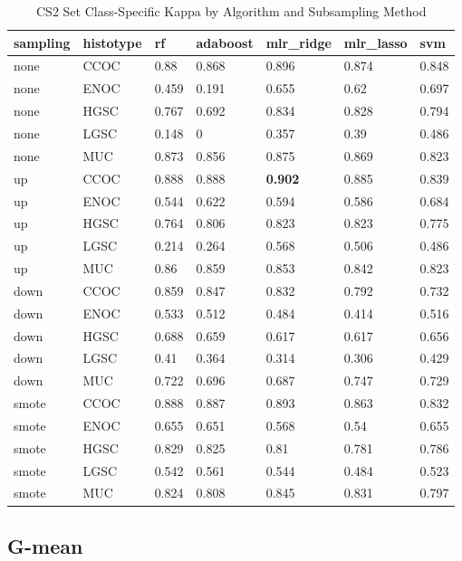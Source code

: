 \documentclass[
]{report}
\begin{document}
\begin{table}

\caption{\label{tab:cs2-kappa-class-table}CS2 Set Class-Specific Kappa by Algorithm and Subsampling Method}
\centering
\begin{tabular}[t]{l|l|l|l|l|l|l}
\hline
sampling & histotype & rf & adaboost & mlr\_ridge & mlr\_lasso & svm\\
\hline
none & CCOC & 0.88 & 0.868 & 0.896 & 0.874 & 0.848\\
\hline
none & ENOC & 0.459 & 0.191 & 0.655 & 0.62 & 0.697\\
\hline
none & HGSC & 0.767 & 0.692 & 0.834 & 0.828 & 0.794\\
\hline
none & LGSC & 0.148 & 0 & 0.357 & 0.39 & 0.486\\
\hline
none & MUC & 0.873 & 0.856 & 0.875 & 0.869 & 0.823\\
\hline
up & CCOC & 0.888 & 0.888 & \textbf{0.902} & 0.885 & 0.839\\
\hline
up & ENOC & 0.544 & 0.622 & 0.594 & 0.586 & 0.684\\
\hline
up & HGSC & 0.764 & 0.806 & 0.823 & 0.823 & 0.775\\
\hline
up & LGSC & 0.214 & 0.264 & 0.568 & 0.506 & 0.486\\
\hline
up & MUC & 0.86 & 0.859 & 0.853 & 0.842 & 0.823\\
\hline
down & CCOC & 0.859 & 0.847 & 0.832 & 0.792 & 0.732\\
\hline
down & ENOC & 0.533 & 0.512 & 0.484 & 0.414 & 0.516\\
\hline
down & HGSC & 0.688 & 0.659 & 0.617 & 0.617 & 0.656\\
\hline
down & LGSC & 0.41 & 0.364 & 0.314 & 0.306 & 0.429\\
\hline
down & MUC & 0.722 & 0.696 & 0.687 & 0.747 & 0.729\\
\hline
smote & CCOC & 0.888 & 0.887 & 0.893 & 0.863 & 0.832\\
\hline
smote & ENOC & 0.655 & 0.651 & 0.568 & 0.54 & 0.655\\
\hline
smote & HGSC & 0.829 & 0.825 & 0.81 & 0.781 & 0.786\\
\hline
smote & LGSC & 0.542 & 0.561 & 0.544 & 0.484 & 0.523\\
\hline
smote & MUC & 0.824 & 0.808 & 0.845 & 0.831 & 0.797\\
\hline
\end{tabular}
\end{table}

\hypertarget{g-mean-2}{%
\subsection{G-mean}\label{g-mean-2}}
\end{document}

